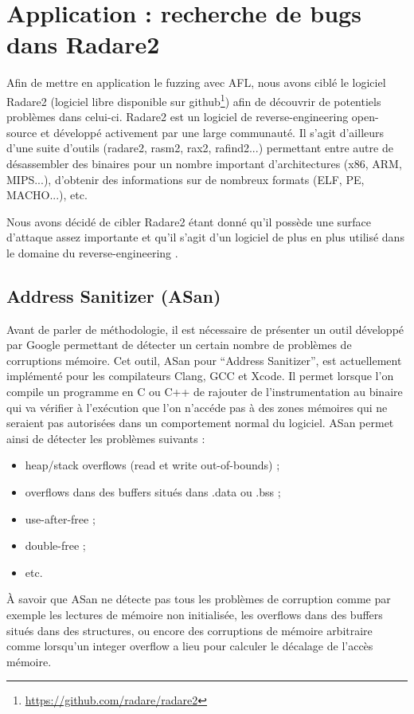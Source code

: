 \chapter{Application : recherche de bugs dans Radare2}

Afin de mettre en application le fuzzing avec AFL, nous avons ciblé le logiciel Radare2 (logiciel libre disponible sur github\footnote{\url{https://github.com/radare/radare2}}) afin de découvrir de potentiels problèmes dans celui-ci.
Radare2 est un logiciel de reverse-engineering open-source et développé activement par une large communauté.
Il s'agit d'ailleurs d'une suite d'outils (radare2, rasm2, rax2, rafind2...) permettant entre autre de désassembler des binaires pour un nombre important d'architectures (x86, ARM, MIPS...), d'obtenir des informations sur de nombreux formats (ELF, PE, MACHO...), etc.

Nous avons décidé de cibler Radare2 étant donné qu'il possède une surface d'attaque assez importante et qu'il s'agit d'un logiciel de plus en plus utilisé dans le domaine du reverse-engineering \cite{radare2}.

\section{Address Sanitizer (ASan)}

Avant de parler de méthodologie, il est nécessaire de présenter un outil développé par Google permettant de détecter un certain nombre de problèmes de corruptions mémoire.
Cet outil, ASan pour ``Address Sanitizer'', est actuellement implémenté pour les compilateurs Clang, GCC et Xcode.
Il permet lorsque l'on compile un programme en C ou C++ de rajouter de l'instrumentation au binaire qui va vérifier à l'exécution que l'on n'accéde pas à des zones mémoires qui ne seraient pas autorisées dans un comportement normal du logiciel.
ASan permet ainsi de détecter les problèmes suivants :

\begin{itemize}
\item heap/stack overflows (read et write out-of-bounds) ;
\item overflows dans des buffers situés dans .data ou .bss ;
\item use-after-free ;
\item double-free ;
\item etc.
\end{itemize}

À savoir que ASan ne détecte pas tous les problèmes de corruption comme par exemple les lectures de mémoire non initialisée, les overflows dans des buffers situés dans des structures, ou encore des corruptions de mémoire arbitraire comme lorsqu'un integer overflow a lieu pour calculer le décalage de l'accès mémoire.

